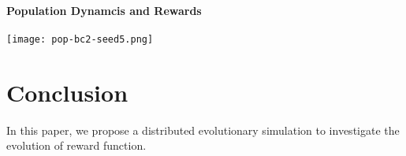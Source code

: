 \paragraph{Population Dynamcis and Rewards}
\begin{figure*}[t]
  \centering
  \texttt{[image: pop-bc2-seed5.png]}
  \caption{}\label{figure:result-population}
\end{figure*}

\section{Conclusion}
In this paper, we propose a distributed evolutionary simulation to investigate the evolution of reward function.